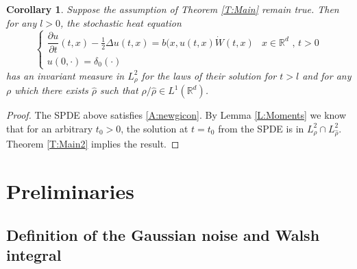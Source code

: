 \documentclass[a4paper,11pt]{article}%
\numberwithin{equation}{section}
\theoremstyle{plain}
\newtheorem{corollary}[theorem]{Corollary}
\theoremstyle{definition}
\newcommand{\R}{\mathbb{R}}
\begin{document}
\begin{corollary}
	\label{C:delta}
	Suppose the assumption of Theorem \ref{T:Main} remain true. Then for any $l>0$, the stochastic heat equation
	\begin{equation}
	\label{E:dspde}
	\begin{cases}
		\dfrac{\partial u}{\partial t}(t,x)-\frac{1}{2}\Delta u(t,x) = b(x,u(t,x)\dot W(t,x) & \text{$x\in \R^d$ , $t>0$} \\
		u(0,\cdot) = \delta_0(\cdot)                                                           &
	\end{cases}
	\end{equation}
	has an invariant measure in $L^2_\rho$ for the laws of their solution for $t>l$ and for any $\rho$ which
	there exists $\hat{\rho}$ such that $\rho/\hat{\rho} \in L^1(\R^d)$.
\end{corollary}

\begin{proof}
	The SPDE above satisfies \eqref{A:newgicon}.
	By Lemma \ref{L:Moments} we know that for an arbitrary $t_0>0$, the solution at $t=t_0$ from the SPDE is in $L^2_\rho \cap L^2_{\widehat{\rho}}$. Theorem \ref{T:Main2} implies the result.
\end{proof}

\section{Preliminaries}
\subsection{Definition of the Gaussian noise and Walsh integral}
\end{document}
